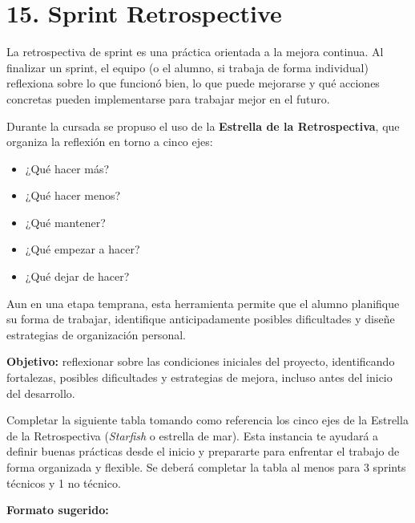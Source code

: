 \documentclass[
11pt, %
codirector, %
]{charter}
\begin{document}
\section{15. Sprint Retrospective}    
\label{sec:sprint_retro}

La retrospectiva de sprint es una práctica orientada a la mejora continua. Al finalizar un sprint, el equipo (o el alumno, si trabaja de forma individual) reflexiona sobre lo que funcionó bien, lo que puede mejorarse y qué acciones concretas pueden implementarse para trabajar mejor en el futuro.

Durante la cursada se propuso el uso de la \textbf{Estrella de la Retrospectiva}, que organiza la reflexión en torno a cinco ejes:

\begin{itemize}
\item  ¿Qué hacer más?
\item  ¿Qué hacer menos?
\item  ¿Qué mantener?
\item  ¿Qué empezar a hacer?
\item  ¿Qué dejar de hacer?
\end{itemize}

Aun en una etapa temprana, esta herramienta permite que el alumno planifique su forma de trabajar, identifique anticipadamente posibles dificultades y diseñe estrategias de organización personal.

\textbf{Objetivo:} reflexionar sobre las condiciones iniciales del proyecto, identificando fortalezas, posibles dificultades y estrategias de mejora, incluso antes del inicio del desarrollo.


Completar la siguiente tabla tomando como referencia los cinco ejes de la Estrella de la Retrospectiva (\emph{Starfish} o estrella de mar). Esta instancia te ayudará a definir buenas prácticas desde el inicio y prepararte para enfrentar el trabajo de forma organizada y flexible. Se deberá completar la tabla al menos para 3 sprints técnicos y 1 no técnico.

\textbf{Formato sugerido:}
\end{document}
